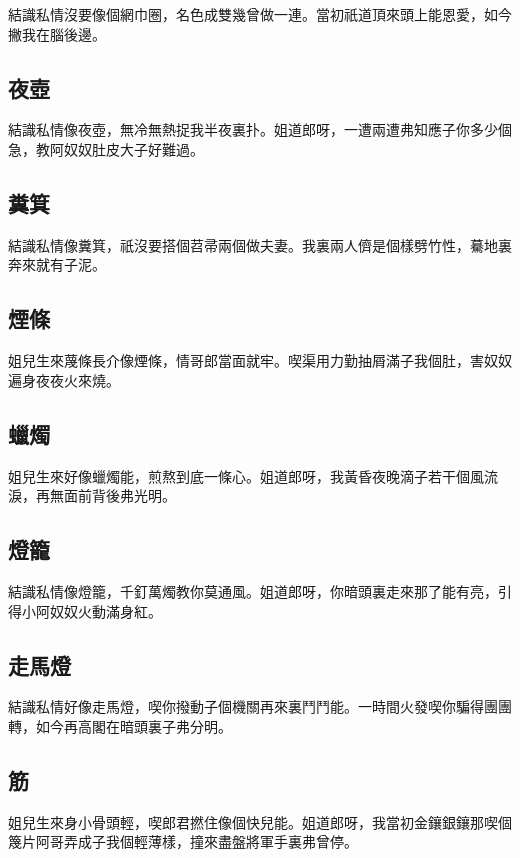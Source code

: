 結識私情沒要像個網巾圈，名色成雙幾曾做一連。當初祇道頂來頭上能恩愛，如今撇我在腦後邊。

\subsection*{夜壺}

結識私情像夜壺，無冷無熱捉我半夜裏扑。姐道郎呀，一遭兩遭弗知應子你多少個急，教阿奴奴肚皮大子好難過。

\subsection*{糞箕}

結識私情像糞箕，祇沒要搭個苕帚兩個做夫妻。我裏兩人儕是個樣劈竹性，驀地裏奔來就有子泥。

\subsection*{煙條}

姐兒生來蔑條長介像煙條，情哥郎當面就牢。喫渠用力勤抽屑滿子我個肚，害奴奴遍身夜夜火來燒。

\subsection*{蠟燭}

姐兒生來好像蠟燭能，煎熬到底一條心。姐道郎呀，我黃昏夜晚滴子若干個風流淚，再無面前背後弗光明。

\subsection*{燈籠}

結識私情像燈籠，千釘萬燭教你莫通風。姐道郎呀，你暗頭裏走來那了能有亮，引得小阿奴奴火動滿身紅。

\subsection*{走馬燈}

結識私情好像走馬燈，喫你撥動子個機關再來裏鬥鬥能。一時間火發喫你騙得團團轉，如今再高閣在暗頭裏子弗分明。

\subsection*{筋}

姐兒生來身小骨頭輕，喫郎君撚住像個快兒能。姐道郎呀，我當初金鑲銀鑲那喫個篾片阿哥弄成子我個輕薄樣，撞來盡盤將軍手裏弗曾停。


